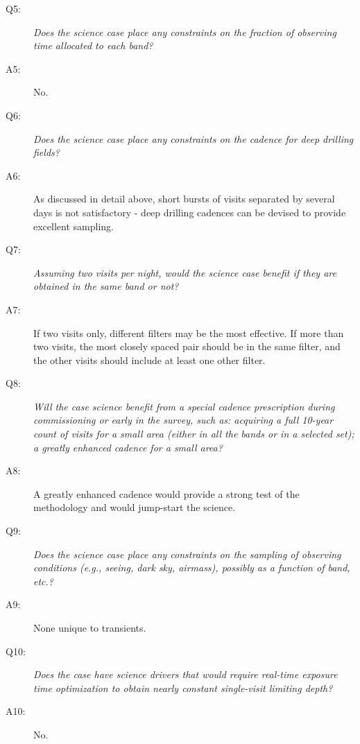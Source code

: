 \begin{description}
 \item[Q5:] {\it Does the science case place any constraints on the
 fraction of observing time allocated to each band?}

 \item[A5:] No.

 \item[Q6:] {\it Does the science case place any constraints on the
 cadence for deep drilling fields?}

 \item[A6:] As discussed in detail above, short bursts of visits separated by several days is not
satisfactory - deep drilling cadences can be devised to provide excellent sampling.

 \item[Q7:] {\it Assuming two visits per night, would the science case
 benefit if they are obtained in the same band or not?}

 \item[A7:] If two visits only, different filters may be the most effective. If more than two visits, the most closely spaced pair should be in the same filter, and the other visits should include at least one other filter.

 \item[Q8:] {\it Will the case science benefit from a special cadence
 prescription during commissioning or early in the survey, such as:
 acquiring a full 10-year count of visits for a small area (either in all
 the bands or in a  selected set); a greatly enhanced cadence for a small
 area?}

 \item[A8:] A greatly enhanced cadence would provide a strong test of the methodology and would jump-start the science.

 \item[Q9:] {\it Does the science case place any constraints on the
 sampling of observing conditions (e.g., seeing, dark sky, airmass),
 possibly as a function of band, etc.?}

 \item[A9:] None unique to transients.

 \item[Q10:] {\it Does the case have science drivers that would require
 real-time exposure time optimization to obtain nearly constant
 single-visit limiting depth?}

 \item[A10:] No.

 \end{description}

 \navigationbar
